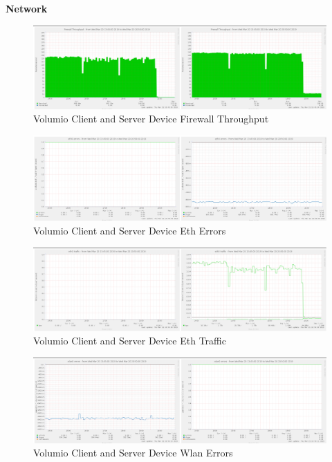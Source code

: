 \documentclass[11pt,a4paper,headinclude=false,footinclude=false]{scrreprt}
\begin{document}
\textbf{Network}

\begin{figure}[H]
\includegraphics{ResultsAndAnalysis/VolumioServerTestImages/012VolumioFirewallThroughput.png}
\centering
\caption{Volumio Client and Server Device Firewall Throughput}
\label{VolumioFirewallThroughput}
\end{figure}

\begin{figure}[H]
\includegraphics{ResultsAndAnalysis/VolumioServerTestImages/010VolumioEth0Errors.png}
\centering
\caption{Volumio Client and Server Device Eth Errors}
\label{VolumioEthError}
\end{figure}

\begin{figure}[H]
\includegraphics{ResultsAndAnalysis/VolumioServerTestImages/011VolumioEth0Traffic.png}
\centering
\caption{Volumio Client and Server Device Eth Traffic}
\label{VolumioEthTraffic}
\end{figure}

\begin{figure}[H]
\includegraphics{ResultsAndAnalysis/VolumioServerTestImages/022VolumioWlan0Errors.png}
\centering
\caption{Volumio Client and Server Device Wlan Errors}
\label{VolumioWlanError}
\end{figure}
\end{document}
